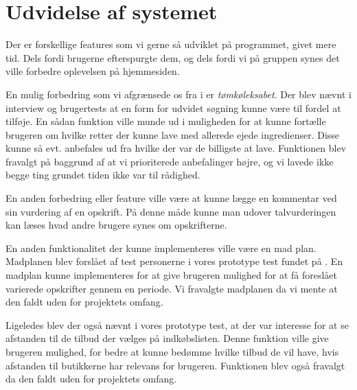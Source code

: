\section{Udvidelse af systemet}\label{udvidelse}

Der er forskellige features som vi gerne så udviklet på programmet, givet mere tid. Dels fordi brugerne efterspurgte dem, og dels fordi vi på gruppen synes det ville forbedre oplevelsen på hjemmesiden.

En mulig forbedring som vi afgrænsede os fra i  er \textit{tømkøleksabet}.
Der blev nævnt i interview og brugertests at en form for udvidet søgning kunne være til fordel at tilføje.
En sådan funktion ville munde ud i muligheden for at kunne fortælle brugeren om hvilke retter der kunne lave med allerede ejede ingredienser.
Disse kunne så evt. anbefales ud fra hvilke der var de billigste at lave.
Funktionen blev fravalgt på baggrund af at vi prioriterede anbefalinger højre, og vi lavede ikke begge ting grundet tiden ikke var til rådighed.

En anden forbedring eller feature ville være at kunne lægge en kommentar ved sin vurdering af en opskrift.
På denne måde kunne man udover talvurderingen kan læses hvad andre brugere synes om opskrifterne. 

En anden funktionalitet der kunne implementeres ville være en mad plan.
Madplanen blev forslået af test personerne i vores prototype test fundet på .
En madplan kunne implementeres for at give brugeren mulighed for at få foreslået varierede opskrifter gennem en periode.
Vi fravalgte madplanen da vi mente at den faldt uden for projektets omfang.

Ligeledes blev der også nævnt i vores prototype test, at der var interesse for at se afstanden til de tilbud der vælges på indkøbslisten.
Denne funktion ville give brugeren mulighed, for bedre at kunne bedømme hvilke tilbud de vil have, hvis afstanden til butikkerne har relevans for brugeren.
Funktionen blev også fravalgt da den faldt uden for projektets omfang.
